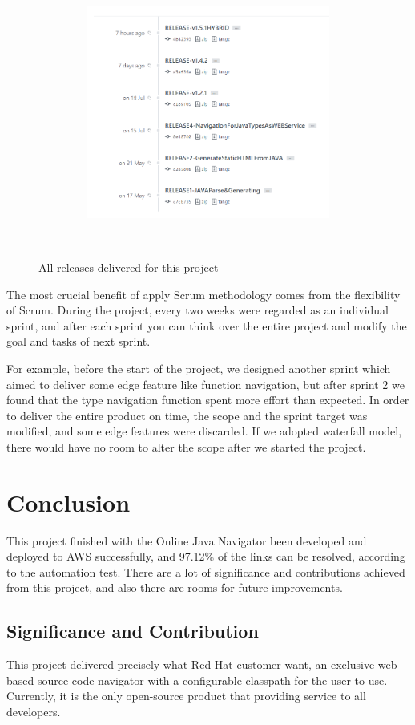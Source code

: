 \documentclass[runningheads]{llncs}
\begin{document}
\begin{figure}[H]
    \centering
    \includegraphics[width=8cm]{pic/github-release.png}
    \caption{All releases delivered for this project\cite{ojn-releases}}
    \label{All releases delivered for this project}
\end{figure}

The most crucial benefit of apply Scrum methodology comes from the flexibility of Scrum. During the project, every two weeks were regarded as an individual sprint, and after each sprint you can think over the entire project and modify the goal and tasks of next sprint. 

For example, before the start of the project, we designed another sprint which aimed to deliver some edge feature like function navigation, but after sprint 2 we found that the type navigation function spent more effort than expected. In order to deliver the entire product on time, the scope and the sprint target was modified, and some edge features were discarded. If we adopted waterfall model, there would have no room to alter the scope after we started the project.
	
\section{Conclusion}
This project finished with the Online Java Navigator been developed and deployed to AWS successfully, and 97.12\% of the links can be resolved, according to the automation test. There are a lot of significance and contributions achieved from this project, and also there are rooms for future improvements.

\subsection{Significance and Contribution}
This project delivered precisely what Red Hat customer want, an exclusive web-based source code navigator with a configurable classpath for the user to use.  Currently, it is the only open-source product that providing service to all developers.
\end{document}
